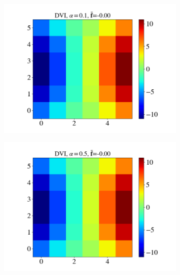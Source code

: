 \begin{itemize}
\begin{figure}[H]
\begin{subfigure}{0.32\columnwidth}
			\includegraphics[width=1.0\textwidth]{images/CD/Example7/5/T2_6_DVI_0.1.png}
		\end{subfigure}
		\begin{subfigure}{0.32\columnwidth}	
			\centering
			\includegraphics[width=1.0\textwidth]{images/CD/Example7/5/T2_6_DVI_0.5.png}
		\end{subfigure}
		\begin{subfigure}{0.32\columnwidth}	
			\centering

\end{subfigure}
\end{figure}
\end{itemize}

